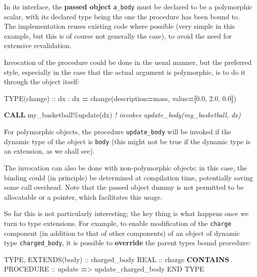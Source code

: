 \documentclass[]{scrartcl}
\newenvironment{Shaded}{}{}
\newcommand{\CommentTok}[1]{\textcolor[rgb]{0.38,0.63,0.69}{\textit{#1}}}
\newcommand{\DataTypeTok}[1]{\textcolor[rgb]{0.56,0.13,0.00}{#1}}
\newcommand{\FloatTok}[1]{\textcolor[rgb]{0.25,0.63,0.44}{#1}}
\newcommand{\KeywordTok}[1]{\textcolor[rgb]{0.00,0.44,0.13}{\textbf{#1}}}
\newcommand{\NormalTok}[1]{#1}
\newcommand{\OperatorTok}[1]{\textcolor[rgb]{0.40,0.40,0.40}{#1}}
\newcommand{\StringTok}[1]{\textcolor[rgb]{0.25,0.44,0.63}{#1}}
\begin{document}
In its interface, the \textbf{passed object} \texttt{a\_body} must be
declared to be a polymorphic scalar, with its declared type being the
one the procedure has been bound to. The implementation reuses existing
code where possible (very simple in this example, but this is of course
not generally the case), to avoid the need for extensive revalidation.

Invocation of the procedure could be done in the usual manner, but the
preferred style, especially in the case that the actual argument is
polymorphic, is to do it through the object itself:

\begin{Shaded}
\begin{Highlighting}[]
\DataTypeTok{TYPE(change)} \DataTypeTok{::}\NormalTok{  dx}
\NormalTok{:}
\NormalTok{dx }\KeywordTok{=}\NormalTok{ change(description}\KeywordTok{=}\StringTok{\textquotesingle{}mass\textquotesingle{}}\NormalTok{, }\DataTypeTok{value}\KeywordTok{=[}\FloatTok{0.0}\NormalTok{, }\FloatTok{2.0}\NormalTok{, }\FloatTok{0.0}\KeywordTok{]}\NormalTok{)}

\KeywordTok{CALL}\NormalTok{ my\_basketball}\OperatorTok{\%}\NormalTok{update(dx) }\CommentTok{! invokes update\_body(my\_basketball, dx)}
\end{Highlighting}
\end{Shaded}

For polymorphic objects, the procedure \texttt{update\_body} will be
invoked if the dynamic type of the object is \texttt{body} (this might
not be true if the dynamic type is an extension, as we shall see).

The invocation can also be done with non-polymorphic objects; in this
case, the binding could (in principle) be determined at compilation
time, potentially saving some call overhead. Note that the passed object
dummy is not permitted to be allocatable or a pointer, which facilitates
this usage.

So far this is not particularly interesting; the key thing is what
happens once we turn to type extensions. For example, to enable
modification of the \texttt{charge} component (in addition to that of
other components) of an object of dynamic type \texttt{charged\_body},
it is possible to \textbf{override} the parent type\textquotesingle s
bound procedure:

\begin{Shaded}
\begin{Highlighting}[]
\DataTypeTok{TYPE}\NormalTok{, }\DataTypeTok{EXTENDS(body)} \DataTypeTok{::}\NormalTok{ charged\_body}
   \DataTypeTok{REAL} \DataTypeTok{::}\NormalTok{ charge}
\KeywordTok{CONTAINS}
   \DataTypeTok{PROCEDURE} \DataTypeTok{::}\NormalTok{ update }\KeywordTok{=}\OperatorTok{\textgreater{}}\NormalTok{ update\_charged\_body}
\DataTypeTok{END TYPE}
\end{Highlighting}
\end{Shaded}
\end{document}
